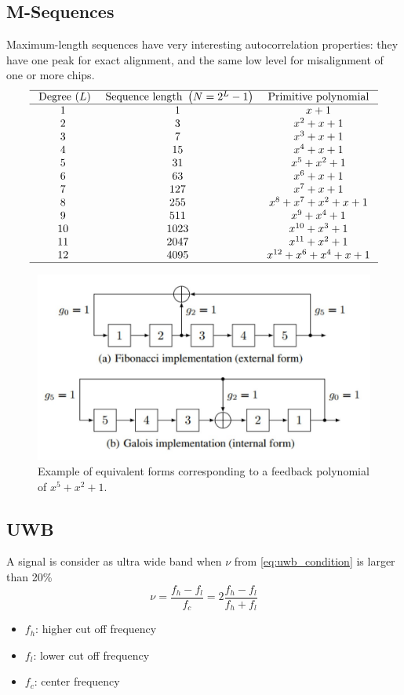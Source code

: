 \subsection{M-Sequences}
Maximum-length sequences have very interesting autocorrelation properties: they have one peak for exact alignment, and the same low level for misalignment of one or more chips.
\begin{equation}
\begin{array}{ccc}
\hline \text { Degree }(L) & \text { Sequence length }\left(N=2^L-1\right) & \text { Primitive polynomial } \\
\hline 1 & 1 & x+1 \\
2 & 3 & x^2+x+1 \\
3 & 7 & x^3+x+1 \\
4 & 15 & x^4+x+1 \\
5 & 31 & x^5+x^2+1 \\
6 & 63 & x^6+x+1 \\
7 & 127 & x^7+x+1 \\
8 & 255 & x^8+x^7+x^2+x+1 \\
9 & 511 & x^9+x^4+1 \\
10 & 1023 & x^{10}+x^3+1 \\
11 & 2047 & x^{11}+x^2+1 \\
12 & 4095 & x^{12}+x^6+x^4+x+1 \\
\hline
\end{array}
\end{equation}
\begin{figure}[ht]
  \centering
  \includegraphics[width=13cm]{images/m-squences.jpg}
  \caption{Example of equivalent forms corresponding to a feedback polynomial of $x^5+x^2+1$.}
  \label{fig:m-squences}
\end{figure}
\subsection{UWB}
A signal is consider as ultra wide band when $\nu$ from \autoref{eq:uwb_condition} is larger than 20\%
\begin{equation}\label{eq:uwb_condition}
\nu=\frac{f_h-f_l}{f_c}=2 \frac{f_h-f_l}{f_h+f_l}
\end{equation}
\begin{itemize}
    \item $f_h$: higher cut off frequency
    \item $f_l$: lower cut off frequency
    \item $f_c$: center frequency
\end{itemize}
